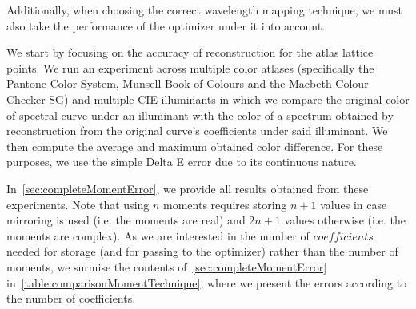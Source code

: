 Additionally, when choosing the correct wavelength mapping technique, we must also take the performance of the optimizer under it into account.

We start by focusing on the accuracy of reconstruction for the atlas lattice points. We run an experiment across multiple color atlases (specifically the Pantone Color System, Munsell Book of Colours and the Macbeth Colour Checker SG) and multiple CIE illuminants in which we compare the original color of spectral curve under an illuminant with the color of a spectrum obtained by reconstruction from the original curve's coefficients under said illuminant. We then compute the average and maximum obtained color difference. For these purposes, we use the simple Delta E error due to its continuous nature.

In~\cref{sec:completeMomentError}, we provide all results obtained from these experiments. Note that using $n$ moments requires storing $n+1$ values in case mirroring is used (i.e. the moments are real) and $2n+1$ values otherwise (i.e. the moments are complex). As we are interested in the number of $coefficients$ needed for storage (and for passing to the optimizer) rather than the number of moments, we surmise the contents of~\cref{sec:completeMomentError} in~\cref{table:comparisonMomentTechnique}, where we present the errors according to the number of coefficients.


